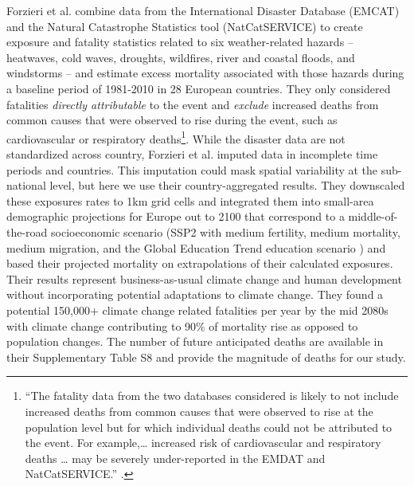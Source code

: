 \documentclass[12pt]{article}
\begin{document}
Forzieri et al. \citeyearpar{forzieri2017increasing} combine data from
the International Disaster Database (EMCAT) and the Natural Catastrophe
Statistics tool (NatCatSERVICE) to create exposure and fatality
statistics related to six weather-related hazards -- heatwaves, cold
waves, droughts, wildfires, river and coastal floods, and windstorms --
and estimate excess mortality associated with those hazards during a
baseline period of 1981-2010 in 28 European countries. They only
considered fatalities \emph{directly attributable} to the event and
\emph{exclude} increased deaths from common causes that were observed to
rise during the event, such as cardiovascular or respiratory
deaths\footnote{``The fatality data from the two databases considered is
  likely to not include increased deaths from common causes that were
  observed to rise at the population level but for which individual
  deaths could not be attributed to the event. For example,\ldots{}
  increased risk of cardiovascular and respiratory deaths \ldots{} may
  be severely under-reported in the EMDAT and NatCatSERVICE.''
  \citep[see][pp.~9, \emph{Supplementary
  Materials}]{forzieri2017increasing}.}. While the disaster data are not
standardized across country, Forzieri et al. imputed data in incomplete
time periods and countries. This imputation could mask spatial
variability at the sub-national level, but here we use their
country-aggregated results. They downscaled these exposures rates to 1km
grid cells and integrated them into small-area demographic projections
for Europe out to 2100 that correspond to a middle-of-the-road
socioeconomic scenario (SSP2 with medium fertility, medium mortality,
medium migration, and the Global Education Trend education scenario
\citep{jiang2014internal, samir2017human, o2017roads}) and based their
projected mortality on extrapolations of their calculated exposures.
Their results represent business-as-usual climate change and human
development without incorporating potential adaptations to climate
change. They found a potential 150,000+ climate change related
fatalities per year by the mid 2080s with climate change contributing to
90\% of mortality rise as opposed to population changes. The number of
future anticipated deaths are available in their Supplementary Table S8
\citep{forzieri2017increasing} and provide the magnitude of deaths for
our study.
\end{document}
